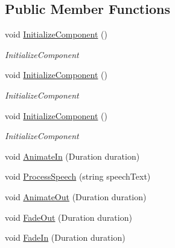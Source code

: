 \subsection*{Public Member Functions}
\begin{DoxyCompactItemize}
\item 
void \hyperlink{class_microsoft_1_1_samples_1_1_kinect_1_1_basic_interactions_1_1_story_selection_control_a58470b21e44399204e9b0c420f9fd138}{Initialize\-Component} ()
\begin{DoxyCompactList}\small\item\em Initialize\-Component \end{DoxyCompactList}\item 
void \hyperlink{class_microsoft_1_1_samples_1_1_kinect_1_1_basic_interactions_1_1_story_selection_control_a58470b21e44399204e9b0c420f9fd138}{Initialize\-Component} ()
\begin{DoxyCompactList}\small\item\em Initialize\-Component \end{DoxyCompactList}\item 
void \hyperlink{class_microsoft_1_1_samples_1_1_kinect_1_1_basic_interactions_1_1_story_selection_control_a58470b21e44399204e9b0c420f9fd138}{Initialize\-Component} ()
\begin{DoxyCompactList}\small\item\em Initialize\-Component \end{DoxyCompactList}\item 
void \hyperlink{class_microsoft_1_1_samples_1_1_kinect_1_1_basic_interactions_1_1_story_selection_control_abf2f97192bb4fbd4dc180178ffd4573f}{Animate\-In} (Duration duration)
\item 
void \hyperlink{class_microsoft_1_1_samples_1_1_kinect_1_1_basic_interactions_1_1_story_selection_control_aceef5b6ecb2ae8774ec5e11c814e2712}{Process\-Speech} (string speech\-Text)
\item 
void \hyperlink{class_microsoft_1_1_samples_1_1_kinect_1_1_basic_interactions_1_1_story_selection_control_aa4a82599cad7b6b346546801c5ce2213}{Animate\-Out} (Duration duration)
\item 
void \hyperlink{class_microsoft_1_1_samples_1_1_kinect_1_1_basic_interactions_1_1_story_selection_control_a6e8614d7f62d0e237226b1e9662a538c}{Fade\-Out} (Duration duration)
\item 
void \hyperlink{class_microsoft_1_1_samples_1_1_kinect_1_1_basic_interactions_1_1_story_selection_control_af3ee9bd8d4f75e395c86681f204a796c}{Fade\-In} (Duration duration)
\end{DoxyCompactItemize}
